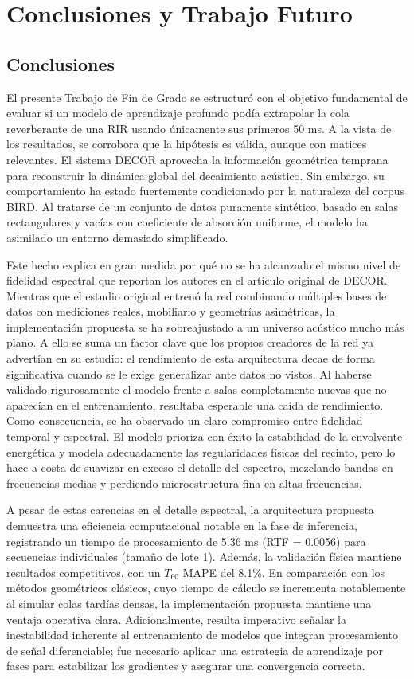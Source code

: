 
\chapter{Conclusiones y Trabajo Futuro}

\section{Conclusiones}

El presente Trabajo de Fin de Grado se estructuró con el objetivo fundamental de evaluar si un modelo de aprendizaje profundo podía extrapolar la cola reverberante de una RIR usando únicamente sus primeros 50 ms. A la vista de los resultados, se corrobora que la hipótesis es válida, aunque con matices relevantes. El sistema DECOR aprovecha la información geométrica temprana para reconstruir la dinámica global del decaimiento acústico. Sin embargo, su comportamiento ha estado fuertemente condicionado por la naturaleza del corpus BIRD. Al tratarse de un conjunto de datos puramente sintético, basado en salas rectangulares y vacías con coeficiente de absorción uniforme, el modelo ha asimilado un entorno demasiado simplificado.  

Este hecho explica en gran medida por qué no se ha alcanzado el mismo nivel de fidelidad espectral que reportan los autores en el artículo original de DECOR. Mientras que el estudio original entrenó la red combinando múltiples bases de datos con mediciones reales, mobiliario y geometrías asimétricas, la implementación propuesta se ha sobreajustado a un universo acústico mucho más plano. A ello se suma un factor clave que los propios creadores de la red ya advertían en su estudio: el rendimiento de esta arquitectura decae de forma significativa cuando se le exige generalizar ante datos no vistos. Al haberse validado rigurosamente el modelo frente a salas completamente nuevas que no aparecían en el entrenamiento, resultaba esperable una caída de rendimiento. Como consecuencia, se ha observado un claro compromiso entre fidelidad temporal y espectral. El modelo prioriza con éxito la estabilidad de la envolvente energética y modela adecuadamente las regularidades físicas del recinto, pero lo hace a costa de suavizar en exceso el detalle del espectro, mezclando bandas en frecuencias medias y perdiendo microestructura fina en altas frecuencias. 

A pesar de estas carencias en el detalle espectral, la arquitectura propuesta demuestra una eficiencia computacional notable en la fase de inferencia, registrando un tiempo de procesamiento de 5.36 ms (RTF = 0.0056) para secuencias individuales (tamaño de lote 1). Además, la validación física mantiene resultados competitivos, con un $T_{60}$ MAPE del 8.1\%. En comparación con los métodos geométricos clásicos, cuyo tiempo de cálculo se incrementa notablemente al simular colas tardías densas, la implementación propuesta mantiene una ventaja operativa clara. Adicionalmente, resulta imperativo señalar la inestabilidad inherente al entrenamiento de modelos que integran procesamiento de señal diferenciable; fue necesario aplicar una estrategia de aprendizaje por fases para estabilizar los gradientes y asegurar una convergencia correcta.

